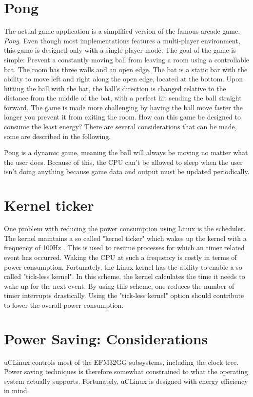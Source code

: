 
\section{Pong}

The actual game application is a simplified version of the famous arcade game, \textit{Pong}. Even though most implementations features a multi-player environment,  this game is designed only with a single-player mode. The goal of the game is simple: Prevent a constantly moving ball from leaving a room using a controllable bat. The room has three walls and an open edge. The bat is a static bar with the ability to move left and right along the open edge, located at the bottom. Upon hitting the ball with the bat, the ball's direction is changed relative to the distance from the middle of the bat, with a perfect hit sending the ball straight forward. The game is made more challenging by having the ball move faster the longer you prevent it from exiting the room. 
How can this game be designed to consume the least energy? There are several considerations that can be made, some are described in the following.

Pong is a dynamic game, meaning the ball will always be moving no matter what the user does. Because of this, the CPU can't be allowed to sleep when the user isn't doing anything because game data and output must be updated periodically. 

\section{Kernel ticker}

One problem with reducing the power consumption using Linux is the scheduler. The kernel maintains a so called "kernel ticker" which wakes up the kernel with a frequency of 100Hz \cite{tickless}. This is used to resume processes for which an timer related event has occurred. Waking the CPU at such a frequency is costly in terms of power consumption. Fortunately, the Linux kernel has the ability to enable a so called "tick-less kernel". In this scheme, the kernel calculates the time it needs to wake-up for the next event. By using this scheme, one reduces the number of timer interrupts drastically. Using the "tick-less kernel" option should contribute to lower the overall power consumption.

\section{Power Saving: Considerations}
uCLinux controls most of the EFM32GG subsystems, including the clock tree. Power saving techniques is therefore somewhat constrained to what the operating system actually supports. Fortunately, uCLinux is designed with energy efficiency in mind. 

